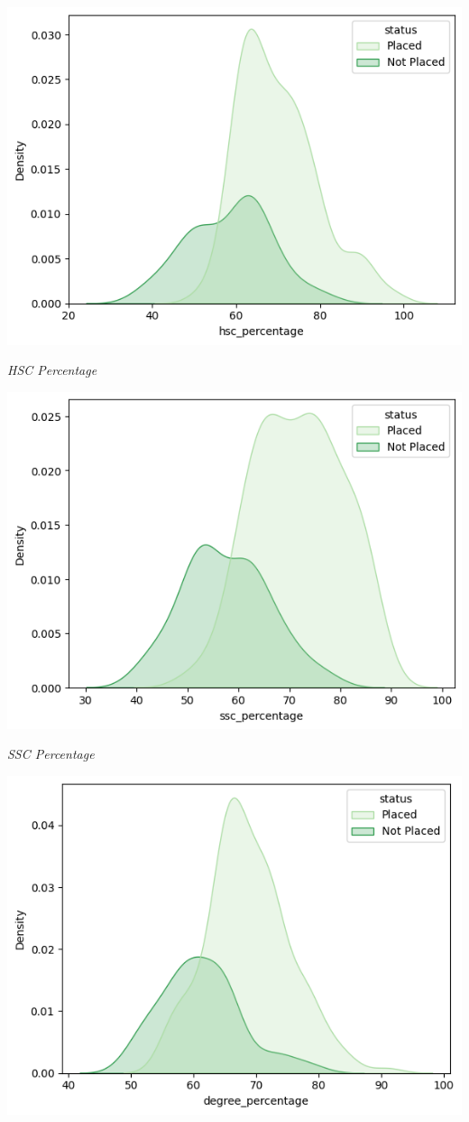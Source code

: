 \documentclass{article}
\begin{document}
\begin{center}
    \includegraphics[scale=0.5]{hscpercentage.png}

    \textit{HSC Percentage}

    \includegraphics[scale=0.5]{sscpercentage.png}

    \textit{SSC Percentage}

    \includegraphics[scale=0.5]{degreepercentage.png}


\end{center}
\end{document}
